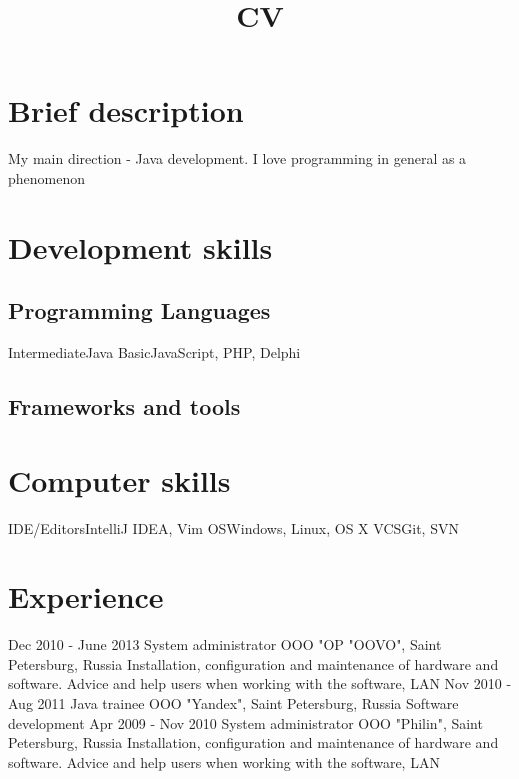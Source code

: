 \documentclass[11pt,a4paper,russian]{moderncv}
\title{CV}
\begin{document}
\maketitle

\section{Brief description}
\cvline
  {}
  {My main direction - Java development.\newline{}
  I love programming in general as a phenomenon}
  
\section{Development skills}
\subsection{Programming Languages}
\cvline
  {Intermediate}{Java}
\cvline
  {Basic}{JavaScript, PHP, Delphi}
\subsection{Frameworks and tools}

\section{Computer skills}
\cvline
  {IDE/Editors}{IntelliJ IDEA, Vim}
\cvline
  {OS}{Windows, Linux, OS X}
\cvline
  {VCS}{Git, SVN}
  
\section{Experience}
\cventry
  {Dec 2010 - June 2013}
  {System administrator}
  {OOO "OP "OOVO", Saint Petersburg, Russia}
  {}{}
  {Installation, configuration and maintenance of hardware and software. 
  \newline{}Advice and help users when working with the software, LAN}
\cventry
  {Nov 2010 - Aug 2011}
  {Java trainee}
  {OOO "Yandex", Saint Petersburg, Russia}
  {}{}
  {Software development}
\cventry
  {Apr 2009 - Nov 2010}
  {System administrator}
  {OOO "Philin", Saint Petersburg, Russia}
  {}{}
  {Installation, configuration and maintenance of hardware and software. 
  \newline{}Advice and help users when working with the software, LAN} 
  
\end{document}
